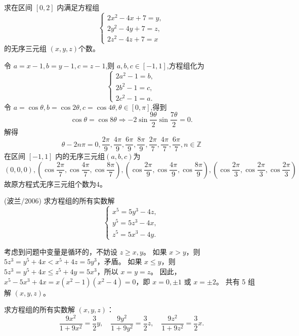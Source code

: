 \begin{questions}
    \question 求在区间 $[0,2]$ 内满足方程组
    \[
    \begin{cases}
    2x^2 - 4x + 7 = y,\\
    2y^2 - 4y + 7 = z,\\
    2z^2 - 4z + 7 = x
    \end{cases}
    \]
    的无序三元组 $(x,y,z)$个数。
    \begin{solution}
        令 $a=x-1, b=y-1, c=z-1$,则 $a,b,c\in[-1,1]$,方程组化为
        \[
        \begin{cases}
        2a^2-1=b,\\
        2b^2-1=c,\\
        2c^2-1=a.
        \end{cases}
        \]
        令 $a=\cos\theta, b=\cos 2\theta, c=\cos 4\theta,\theta\in[0,\pi]$,得到
        \[
        \cos\theta = \cos 8\theta \Rightarrow -2\sin\frac{9\theta}{2}\sin\frac{7\theta}{2} = 0.
        \]
        解得 
        \[
        \theta -2n\pi= 0, \frac{2\pi}{9}, \frac{4\pi}{9}, \frac{6\pi}{9}, \frac{8\pi}{9}, \frac{2\pi}{7}, \frac{4\pi}{7}, \frac{6\pi}{7},n \in \mathbb{Z}
        \] 
        在区间 $[-1,1]$ 内的无序三元组$(a,b,c)$为 
        \[
        (0,0,0), \left(\cos\frac{2\pi}{7},\cos\frac{4\pi}{7},\cos\frac{8\pi}{7}\right), \left(\cos\frac{2\pi}{9},\cos\frac{4\pi}{9},\cos\frac{8\pi}{9}\right), \left(\cos\frac{2\pi}{3},\cos\frac{2\pi}{3},\cos\frac{2\pi}{3}\right)
        \] 
        故原方程式无序三元组个数为$4$。
    \end{solution}

    \question (波兰/2006) 求方程组的所有实数解
\[
\begin{cases} x^5 = 5y^3 - 4z, \\ y^5 = 5z^3 - 4x, \\ z^5 = 5x^3 - 4y. \end{cases}
\]

\begin{solution}
考虑到问题中变量是循环的，不妨设 $z \ge x, y$。
如果 $x > y$，则 $5z^3 = y^5 + 4x < x^5 + 4z = 5y^3$，矛盾。
如果 $x \le y$，则 $5z^3 = y^5 + 4x \le z^5 + 4y = 5x^3$，所以 $x = y = z$。
因此，$x^5 - 5x^3 + 4x = x(x^2 - 1)(x^2 - 4) = 0$，即 $x = 0, \pm 1$ 或 $x = \pm 2$。
共有 5 组解 $(x, y, z)$。
\end{solution}

    \question 求方程组的所有实数解 $(x, y, z)$：
\[
\frac{9x^2}{1 + 9x^2} = \frac{3}{2}y, \quad \frac{9y^2}{1 + 9y^2} = \frac{3}{2}z, \quad \frac{9z^2}{1 + 9z^2} = \frac{3}{2}x.
\]


\end{questions}
